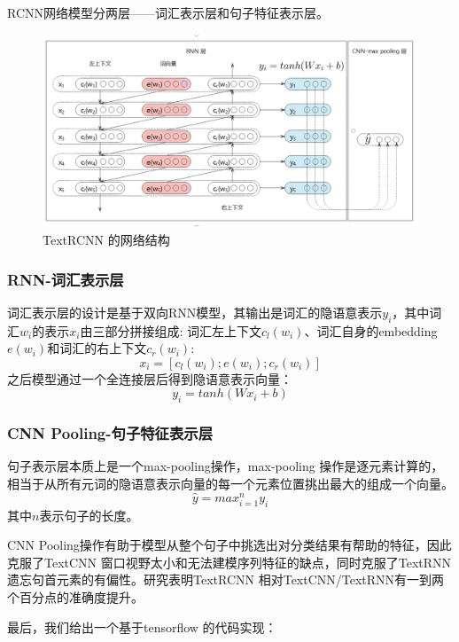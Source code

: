 \documentclass[twoside,a4paper,12pt]{book}%
\begin{document}
RCNN网络模型分两层——词汇表示层和句子特征表示层。
\begin{figure}[htbp]
\begin{center}
\includegraphics[width=5.6in]{figures/textrcnn1.png}
\caption{TextRCNN 的网络结构}
\label{fig:textrcnn1}
\end{center}
\end{figure}
\subsubsection{RNN-词汇表示层}
词汇表示层的设计是基于双向\gls{RNN}模型，其输出是词汇的隐语意表示$y_i$，其中词汇$w_i$的表示$x_i$由三部分拼接组成: 词汇左上下文$c_l(w_i)$、词汇自身的embedding$e(w_i)$和词汇的右上下文$c_r(w_i)$:
$$
x_i=[c_l(w_i);e(w_i);c_r(w_i)]
$$
之后模型通过一个全连接层后得到隐语意表示向量：
$$
y_i=tanh(Wx_i+b)
$$
\subsubsection{CNN Pooling-句子特征表示层}
句子表示层本质上是一个max-pooling操作，max-pooling 操作是逐元素计算的，相当于从所有元词的隐语意表示向量的每一个元素位置挑出最大的组成一个向量。
$$
\hat{y} = max_{i=1}^{n}y_i 
$$
其中$n$表示句子的长度。

\gls{CNN} Pooling操作有助于模型从整个句子中挑选出对分类结果有帮助的特征，因此克服了TextCNN 窗口视野太小和无法建模序列特征的缺点，同时克服了TextRNN 遗忘句首元素的有偏性。研究表明TextRCNN 相对TextCNN/TextRNN有一到两个百分点的准确度提升。

最后，我们给出一个基于tensorflow 的代码实现：
\end{document}
